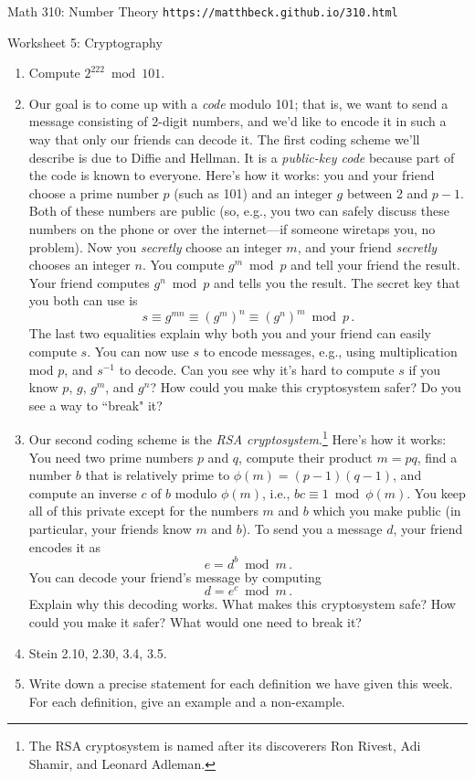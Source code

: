 \documentclass[11pt]{article}
\begin{document}
\setlength{\parindent}{0pt}
\setlength{\parskip}{0.2cm}

{ Math 310: Number Theory} \hfill {\tt https://matthbeck.github.io/310.html}

\vspace{.3in}

\begin{center}
\Large{Worksheet 5: Cryptography}
\end{center}

\begin{enumerate}

\item Compute $2^{ 222 } \bmod 101$.

\item Our goal is to come up with a \emph{code} modulo 101; that is, we want to send a message consisting of 2-digit
numbers, and we'd like to encode it in such a way that only our friends can decode it.
The first coding scheme we'll describe is due to Diffie and Hellman. It is a \emph{public-key code} because
part of the code is known to everyone. Here's how it works: you and your friend choose a prime number $p$ (such as 101) and an integer $g$ between 2 and $p-1$. Both of these numbers are public (so, e.g., you two can safely discuss these
numbers on the phone or over the internet---if someone wiretaps you, no problem).
Now you \emph{secretly} choose an integer $m$, and your friend \emph{secretly} chooses an integer $n$. You compute
$g^m \bmod p$ and tell your friend the result. Your friend computes $g^n \bmod p$ and tells you the result. The
secret key that you both can use is
\[
  s \equiv g^{ mn } \equiv \left( g^m \right)^n \equiv \left( g^n \right)^m \bmod p \, .
\]
The last two equalities explain why both you and your friend can easily compute $s$.
You can now use $s$ to encode messages, e.g., using multiplication mod $p$, and $s^{ -1 }$ to decode.
Can you see why it's hard to compute $s$ if you know $p$, $g$, $g^m$, and $g^n$? How could you make this
cryptosystem safer? Do you see a way to ``break" it?

\item Our second coding scheme is the \emph{RSA cryptosystem}.\footnote{
The RSA cryptosystem is named after its discoverers Ron Rivest, Adi Shamir, and Leonard Adleman.
}
Here's how it works: You need two prime numbers $p$ and $q$, compute their product $m = pq$, find a number $b$ that
is relatively prime to $\phi(m) = (p-1)(q-1)$, and compute an inverse $c$ of $b$ modulo $\phi(m)$, i.e., $bc \equiv
1 \bmod \phi(m)$.
You keep all of this private except for the numbers $m$ and $b$ which you make public (in particular, your friends
know $m$ and $b$). To send you a message $d$, your friend encodes it as
\[
  e = d^b \bmod m \, .
\]
You can decode your friend's message by computing
\[
  d = e^c \bmod m \, .
\]
Explain why this decoding works.
What makes this cryptosystem safe? How could you make it safer? What would one need to break it?

\item Stein 2.10, 2.30, 3.4, 3.5.
 
\item Write down a precise statement for each definition we have given this week.
For each definition, give an example and a non-example.

\end{enumerate}
\end{document}
